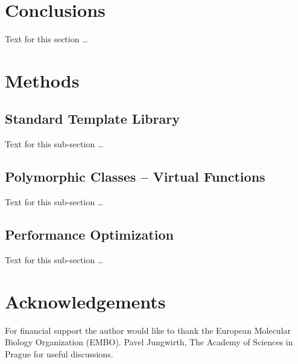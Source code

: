 \documentclass[10pt]{bmc_article}
\newenvironment{bmcformat}{\fussy\setboolean{publ}{true}}{\fussy}
\begin{document}
\begin{bmcformat}



    

\section*{Conclusions}
  Text for this section \ldots


  
\section*{Methods}
  \subsection*{Standard Template Library}
    Text for this sub-section \ldots

  \subsection*{Polymorphic Classes -- Virtual Functions}
    Text for this sub-section \ldots

  \subsection*{Performance Optimization}
    Text for this sub-section \ldots


    

    

\section*{Acknowledgements}
  For financial support the author would like to thank the European Molecular Biology Organization (EMBO).
 Pavel Jungwirth, The Academy of Sciences in Prague for useful discussions.


\end{bmcformat}
\end{document}
